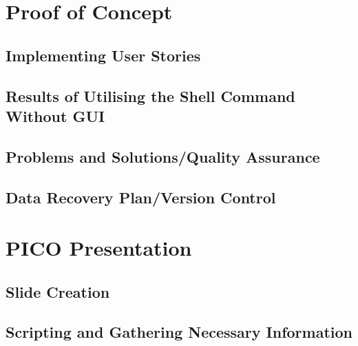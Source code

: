 \documentclass{article}
\begin{document}
\section{Proof of Concept}

\subsection{Implementing User Stories}


\subsection{Results of Utilising the Shell Command Without GUI}


\subsection{Problems and Solutions/Quality Assurance}



\subsection{Data Recovery Plan/Version Control}




\section{PICO Presentation}

\subsection{Slide Creation}



\subsection{Scripting and Gathering Necessary Information}
\end{document}
